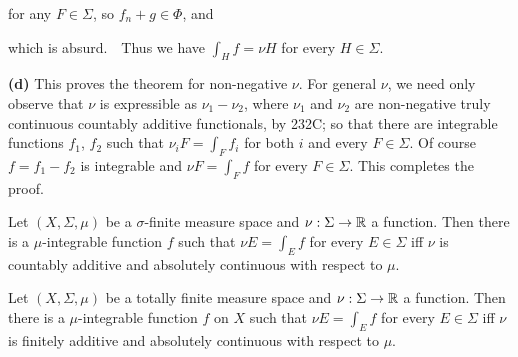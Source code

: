 {\noindent for any $F\in\Sigma$, so $f_n+g\in\Phi$, and


\noindent which is absurd.\ \BanG\ Thus we have $\int_Hf=\nu H$ for
every $H\in\Sigma$.

\medskip

{\bf (d)} This proves the theorem for non-negative $\nu$.   For general
$\nu$, we need only observe that $\nu$ is expressible as $\nu_1-\nu_2$,
where $\nu_1$ and $\nu_2$ are non-negative truly continuous countably
additive functionals, by 232C;  so that there are integrable functions
$f_1$, $f_2$ such that $\nu_iF=\int_Ff_i$ for both $i$ and every
$F\in\Sigma$.
Of course $f=f_1-f_2$ is integrable and $\nu F=\int_Ff$ for every
$F\in\Sigma$.   This completes the proof.
}%

 Let $(X,\Sigma,\mu)$ be a $\sigma$-finite
measure
space and $\nu:\Sigma\to\Bbb R$ a function.   Then there is a
$\mu$-integrable function $f$ such that $\nu E=\int_Ef$ for every
$E\in\Sigma$ iff $\nu$ is countably additive and absolutely continuous
with respect to $\mu$.


 Let $(X,\Sigma,\mu)$ be a  totally finite
measure
space and $\nu:\Sigma\to\Bbb R$ a function.   Then there is a
$\mu$-integrable function $f$ on $X$ such that $\nu E=\int_Ef$ for every
$E\in\Sigma$ iff $\nu$ is finitely additive and absolutely continuous
with respect to $\mu$.


